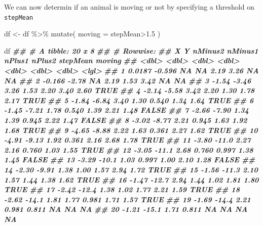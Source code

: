\documentclass[
]{book}
\newenvironment{Shaded}{\begin{snugshade}}{\end{snugshade}}
\newcommand{\AttributeTok}[1]{\textcolor[rgb]{0.77,0.63,0.00}{#1}}
\newcommand{\DocumentationTok}[1]{\textcolor[rgb]{0.56,0.35,0.01}{\textbf{\textit{#1}}}}
\newcommand{\FloatTok}[1]{\textcolor[rgb]{0.00,0.00,0.81}{#1}}
\newcommand{\FunctionTok}[1]{\textcolor[rgb]{0.00,0.00,0.00}{#1}}
\newcommand{\NormalTok}[1]{#1}
\newcommand{\OtherTok}[1]{\textcolor[rgb]{0.56,0.35,0.01}{#1}}
\newcommand{\SpecialCharTok}[1]{\textcolor[rgb]{0.00,0.00,0.00}{#1}}
\begin{document}
We can now determin if an animal is moving or not by specifying a threshold on \texttt{stepMean}

\begin{Shaded}
\begin{Highlighting}[]

\NormalTok{df }\OtherTok{\textless{}{-}}\NormalTok{ df }\SpecialCharTok{\%\textgreater{}\%} 
  \FunctionTok{mutate}\NormalTok{(}
    \AttributeTok{moving =}\NormalTok{ stepMean}\SpecialCharTok{\textgreater{}}\FloatTok{1.5}
\NormalTok{    )}

\NormalTok{df}
\DocumentationTok{\#\# \# A tibble: 20 x 8}
\DocumentationTok{\#\# \# Rowwise: }
\DocumentationTok{\#\#          X       Y nMinus2 nMinus1 nPlus1 nPlus2 stepMean moving}
\DocumentationTok{\#\#      \textless{}dbl\textgreater{}   \textless{}dbl\textgreater{}   \textless{}dbl\textgreater{}   \textless{}dbl\textgreater{}  \textless{}dbl\textgreater{}  \textless{}dbl\textgreater{}    \textless{}dbl\textgreater{} \textless{}lgl\textgreater{} }
\DocumentationTok{\#\#  1  0.0187  {-}0.596   NA     NA      2.19    3.26    NA    NA    }
\DocumentationTok{\#\#  2 {-}0.166   {-}2.78    NA      2.19   1.53    3.42    NA    NA    }
\DocumentationTok{\#\#  3 {-}1.54    {-}3.46     3.26   1.53   2.20    3.40     2.60 TRUE  }
\DocumentationTok{\#\#  4 {-}2.14    {-}5.58     3.42   2.20   1.30    1.78     2.17 TRUE  }
\DocumentationTok{\#\#  5 {-}1.84    {-}6.84     3.40   1.30   0.540   1.34     1.64 TRUE  }
\DocumentationTok{\#\#  6 {-}1.45    {-}7.21     1.78   0.540  1.39    2.21     1.48 FALSE }
\DocumentationTok{\#\#  7 {-}2.66    {-}7.90     1.34   1.39   0.945   2.22     1.47 FALSE }
\DocumentationTok{\#\#  8 {-}3.02    {-}8.77     2.21   0.945  1.63    1.92     1.68 TRUE  }
\DocumentationTok{\#\#  9 {-}4.65    {-}8.88     2.22   1.63   0.361   2.27     1.62 TRUE  }
\DocumentationTok{\#\# 10 {-}4.91    {-}9.13     1.92   0.361  2.16    2.68     1.78 TRUE  }
\DocumentationTok{\#\# 11 {-}3.80   {-}11.0      2.27   2.16   0.760   1.03     1.55 TRUE  }
\DocumentationTok{\#\# 12 {-}3.05   {-}11.1      2.68   0.760  0.997   1.38     1.45 FALSE }
\DocumentationTok{\#\# 13 {-}3.29   {-}10.1      1.03   0.997  1.00    2.10     1.28 FALSE }
\DocumentationTok{\#\# 14 {-}2.30    {-}9.91     1.38   1.00   1.57    2.94     1.72 TRUE  }
\DocumentationTok{\#\# 15 {-}1.56   {-}11.3      2.10   1.57   1.44    1.38     1.62 TRUE  }
\DocumentationTok{\#\# 16 {-}1.47   {-}12.7      2.94   1.44   1.02    1.81     1.80 TRUE  }
\DocumentationTok{\#\# 17 {-}2.42   {-}12.4      1.38   1.02   1.77    2.21     1.59 TRUE  }
\DocumentationTok{\#\# 18 {-}2.62   {-}14.1      1.81   1.77   0.981   1.71     1.57 TRUE  }
\DocumentationTok{\#\# 19 {-}1.69   {-}14.4      2.21   0.981  0.811  NA       NA    NA    }
\DocumentationTok{\#\# 20 {-}1.21   {-}15.1      1.71   0.811 NA      NA       NA    NA}


\end{Highlighting}
\end{Shaded}
\end{document}
